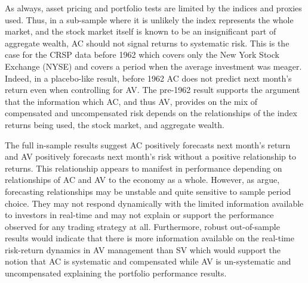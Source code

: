 As always, asset pricing and portfolio tests are limited by the indices and proxies used.  Thus, in a sub-sample where it is unlikely the index represents the whole market, and the stock market itself is known to be an insignificant part of aggregate wealth, AC should not signal returns to systematic risk. This is the case for the CRSP data before 1962 which covers only the New York Stock Exchange (NYSE) and covers a period when the average investment was meager. \citep{taylor_2014} Indeed, in a placebo-like result, before 1962 AC does not predict next month's return even when controlling for AV. The pre-1962 result supports the \citet{pollet_average_2010} argument that the information which AC, and thus AV, provides on the mix of compensated and uncompensated risk depends on the relationships of the index returns being used, the stock market, and aggregate wealth.

The full in-sample results suggest AC positively forecasts next month's return and AV positively forecasts next month's risk without a positive relationship to returns. This relationship appears to manifest in performance depending on relationships of AC and AV to the economy as a whole. However, as \citet{Welch2008} argue, forecasting relationships may be unstable and quite sensitive to sample period choice. They may not respond dynamically with the limited information available to investors in real-time and may not explain or support the performance observed for any trading strategy at all. Furthermore, robust out-of-sample results would indicate that there is more information available on the real-time risk-return dynamics in AV management than SV which would support the notion that AC is systematic and compensated while AV is un-systematic and uncompensated explaining the portfolio performance results.

